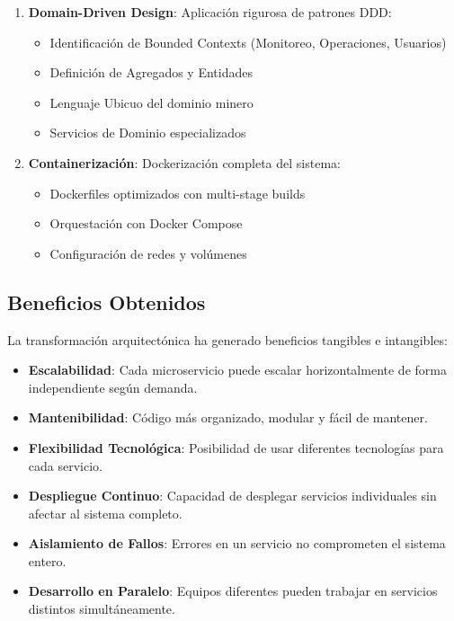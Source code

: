 \documentclass[12pt,a4paper]{article}
\begin{document}
\begin{enumerate}[leftmargin=*]
    \item \textbf{Domain-Driven Design}: Aplicación rigurosa de patrones DDD:
    \begin{itemize}
        \item Identificación de Bounded Contexts (Monitoreo, Operaciones, Usuarios)
        \item Definición de Agregados y Entidades
        \item Lenguaje Ubicuo del dominio minero
        \item Servicios de Dominio especializados
    \end{itemize}

    \item \textbf{Containerización}: Dockerización completa del sistema:
    \begin{itemize}
        \item Dockerfiles optimizados con multi-stage builds
        \item Orquestación con Docker Compose
        \item Configuración de redes y volúmenes
    \end{itemize}
\end{enumerate}

\subsection{Beneficios Obtenidos}

La transformación arquitectónica ha generado beneficios tangibles e intangibles:

\begin{itemize}[leftmargin=*]
    \item \textbf{Escalabilidad}: Cada microservicio puede escalar horizontalmente de forma independiente según demanda.
    \item \textbf{Mantenibilidad}: Código más organizado, modular y fácil de mantener.
    \item \textbf{Flexibilidad Tecnológica}: Posibilidad de usar diferentes tecnologías para cada servicio.
    \item \textbf{Despliegue Continuo}: Capacidad de desplegar servicios individuales sin afectar al sistema completo.
    \item \textbf{Aislamiento de Fallos}: Errores en un servicio no comprometen el sistema entero.
    \item \textbf{Desarrollo en Paralelo}: Equipos diferentes pueden trabajar en servicios distintos simultáneamente.
\end{itemize}
\end{document}
